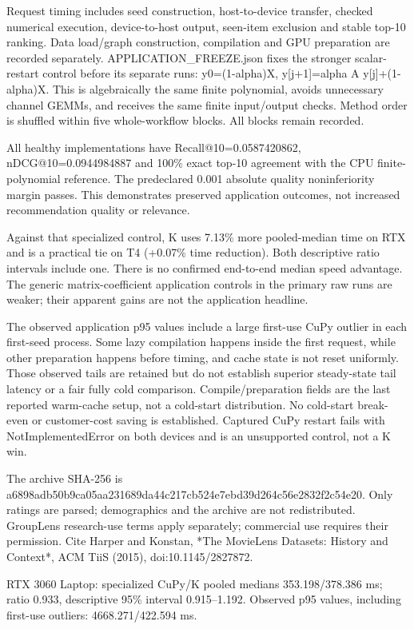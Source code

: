\documentclass[10pt]{article}
\begin{document}
Request timing includes seed construction, host-to-device transfer, checked numerical execution, device-to-host output, seen-item exclusion and stable top-10 ranking. Data load/graph construction, compilation and GPU preparation are recorded separately. APPLICATION\_FREEZE.json fixes the stronger scalar-restart control before its separate runs: y0=(1-alpha)X, y[j+1]=alpha A y[j]+(1-alpha)X. This is algebraically the same finite polynomial, avoids unnecessary channel GEMMs, and receives the same finite input/output checks. Method order is shuffled within five whole-workflow blocks. All blocks remain recorded.

All healthy implementations have Recall@10=0.0587420862, nDCG@10=0.0944984887 and 100\% exact top-10 agreement with the CPU finite-polynomial reference. The predeclared 0.001 absolute quality noninferiority margin passes. This demonstrates preserved application outcomes, not increased recommendation quality or relevance.

Against that specialized control, K uses 7.13\% more pooled-median time on RTX and is a practical tie on T4 (+0.07\% time reduction). Both descriptive ratio intervals include one. There is no confirmed end-to-end median speed advantage. The generic matrix-coefficient application controls in the primary raw runs are weaker; their apparent gains are not the application headline.

The observed application p95 values include a large first-use CuPy outlier in each first-seed process. Some lazy compilation happens inside the first request, while other preparation happens before timing, and cache state is not reset uniformly. Those observed tails are retained but do not establish superior steady-state tail latency or a fair fully cold comparison. Compile/preparation fields are the last reported warm-cache setup, not a cold-start distribution. No cold-start break-even or customer-cost saving is established. Captured CuPy restart fails with NotImplementedError on both devices and is an unsupported control, not a K win.

The archive SHA-256 is a6898adb50b9ca05aa231689da44c217cb524e7ebd39d264c56e2832f2c54e20. Only ratings are parsed; demographics and the archive are not redistributed. GroupLens research-use terms apply separately; commercial use requires their permission. Cite Harper and Konstan, *The MovieLens Datasets: History and Context*, ACM TiiS (2015), doi:10.1145/2827872.

RTX 3060 Laptop: specialized CuPy/K pooled medians 353.198/378.386 ms; ratio 0.933, descriptive 95\% interval 0.915--1.192. Observed p95 values, including first-use outliers: 4668.271/422.594 ms.
\end{document}
